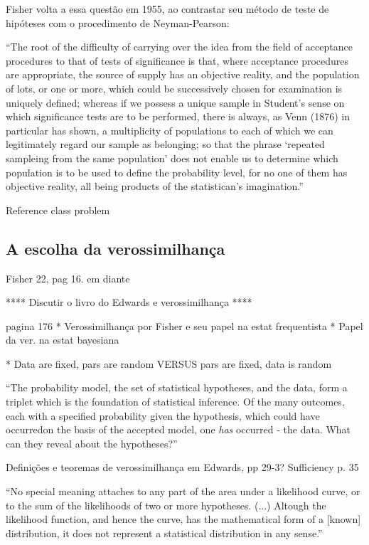Fisher volta a essa questão em 1955, ao contrastar seu método de teste de hipóteses com o procedimento de Neyman-Pearson:

``The root of the difficulty of carrying over the idea from the field of acceptance procedures to that of tests of significance
is that, where acceptance procedures are appropriate, the source of supply has an objective reality, and the population
of lots, or one or more, which could be successively chosen for examination is uniquely defined; whereas if we possess a unique
sample in Student's sense on which significance tests are to be performed, there is always, as Venn (1876) in particular has
shown, a multiplicity of populations to each of which we can legitimately regard our sample as belonging; so that the phrase
`repeated sampleing from the same population' does not enable us to determine which population is to be used to define the
probability level, for no one of them has objective reality, all being products of the statistican's imagination.''
\cite{Fisher1955}

Reference class problem

\subsection{A escolha da verossimilhança}
Fisher 22, pag 16. em diante

**** Discutir o livro do Edwards e verossimilhança ****

 pagina 176
* Verossimilhança por Fisher e seu papel na estat frequentista
* Papel da ver. na estat bayesiana

* Data are fixed, pars are random VERSUS pars are fixed, data is random

``The probability model, the set of statistical hypotheses, and the data, form a triplet which is the foundation of
statistical inference. Of the many outcomes, each with a specified probability given the hypothesis, which could have
occurredon the basis of the accepted model, one {\em has} occurred - the data. What can they reveal about the hypotheses?''
\cite{Edwards72}


Definições e teoremas de verossimilhança em Edwards, pp 29-3?
Sufficiency p. 35

``No special meaning attaches to any part of the area under a likelihood curve, or to the sum of the likelihoods of two or more
hypotheses.
(...)
Altough the likelihood function, and hence the curve, has the mathematical form of a [known] distribution, it does not
represent a statistical distribution in any sense.''\cite{Edwards72}

